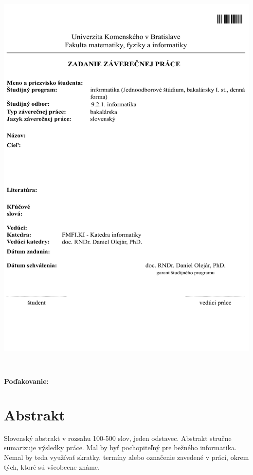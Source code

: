 \documentclass[12pt, oneside]{book}
\begin{document}
\newpage 
\thispagestyle{empty}
\hspace{-2cm}\includegraphics[width=1.1\textwidth]{images/zadanie}


\frontmatter

\setcounter{page}{3}
\newpage 
~

\vfill
{\bf Poďakovanie:}


\newpage 
\section*{Abstrakt}


Slovenský abstrakt v rozsahu 100-500 slov, jeden odstavec. Abstrakt
stručne sumarizuje výsledky práce. Mal by byť pochopiteľný pre bežného
informatika. Nemal by teda využívať skratky, termíny alebo označenie
zavedené v práci, okrem tých, ktoré sú všeobecne známe.
\end{document}
